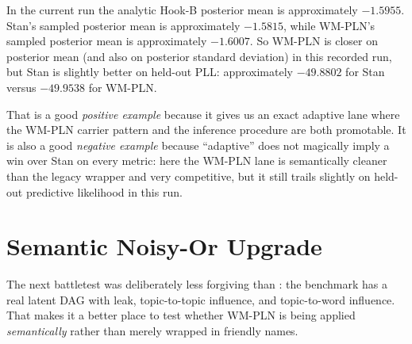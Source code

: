 \documentclass[11pt,openany]{report}
\begin{document}
\begin{table}[htbp]
\centering
\caption{Exact Hook-B adaptive Normal-Normal comparison.  This is one of the
cleanest WM-PLN lanes in the appendix because both the carrier and the full
inference procedure are exact: the only sampling is from the exact queried
posterior mixture itself.}
\label{tab:pplbench-hookb-normal}
\end{table}

In the current run the analytic Hook-B posterior mean is approximately
$-1.5955$.  Stan's sampled posterior mean is approximately $-1.5815$, while
WM-PLN's sampled posterior mean is approximately $-1.6007$.  So WM-PLN is
closer on posterior mean (and also on posterior standard deviation) in this
recorded run, but Stan is slightly better on held-out PLL:
approximately $-49.8802$ for Stan versus $-49.9538$ for WM-PLN.

That is a good \emph{positive example} because it gives us an exact adaptive
lane where the WM-PLN carrier pattern and the inference procedure are both
promotable.  It is also a good \emph{negative example} because ``adaptive''
does not magically imply a win over Stan on every metric: here the WM-PLN
lane is semantically cleaner than the legacy wrapper and very competitive,
but it still trails slightly on held-out predictive likelihood in this run.

\section{Semantic Noisy-Or Upgrade}
\label{app:pplbench-noisy-or-semantic}

The next battletest was deliberately less forgiving than
: the  benchmark has a real
latent DAG with leak, topic-to-topic influence, and topic-to-word influence.
That makes it a better place to test whether WM-PLN is being applied
\emph{semantically} rather than merely wrapped in friendly names.
\end{document}
